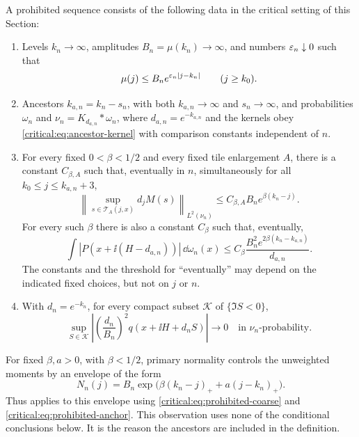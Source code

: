 \begin{definition}\label{def:prohibited-sequence}
A prohibited sequence consists of the following data in the critical
setting of this Section:
\begin{enumerate}[label=\textup{(\roman*)}]
 \item Levels \(k_n\to\infty\), amplitudes
 \(B_n=\mu(k_n)\to\infty\), and numbers \(\varepsilon_n\downarrow0\)
 such that
 \begin{equation}\label{critical:eq:primary-normality}
  \mu(j)\le B_n e^{\varepsilon_n|j-k_n|}
       \qquad(j\ge k_0).
 \end{equation}
 \item Ancestors \(k_{a,n}=k_n-s_n\), with both
 \(k_{a,n}\to\infty\) and \(s_n\to\infty\), and probabilities
 \(\omega_n\) and
 \(\nu_n=K_{d_{a,n}}*\omega_n\), where
 \(d_{a,n}=e^{-k_{a,n}}\) and the kernels obey
 \eqref{critical:eq:ancestor-kernel} with comparison constants
 independent of \(n\).
 \item For every fixed \(0<\beta<1/2\) and every fixed tile
 enlargement \(A\), there is a constant \(C_{\beta,A}\) such that,
 eventually in \(n\), simultaneously for all
 \(k_0\le j\le k_{a,n}+3\),
 \begin{equation}\label{critical:eq:prohibited-coarse}
  \left\|\sup_{s\in\mathcal T_A(j,x)}d_jM(s)\right\|_{L^2(\nu_n)}
   \le C_{\beta,A} B_n e^{\beta(k_n-j)}.
 \end{equation}
 For every such \(\beta\) there is also a constant \(C_\beta\)
 such that, eventually,
 \begin{equation}\label{critical:eq:prohibited-anchor}
  \int |P(x+\ii(H-d_{a,n}))|\,\dd\omega_n(x)
   \le C_\beta
       \frac{B_n^2e^{2\beta(k_n-k_{a,n})}}{d_{a,n}}.
 \end{equation}
 The constants and the threshold for ``eventually'' may depend on
 the indicated fixed choices, but not on \(j\) or \(n\).
 \item With \(d_n=e^{-k_n}\), for every compact subset
 \(\mathcal K\) of \(\{\Im S<0\}\),
 \begin{equation}\label{critical:eq:prohibited-Q}
  \sup_{S\in\mathcal K}
  \left|\left(\frac{d_n}{B_n}\right)^2
          q(x+\ii H+d_nS)\right|
  \longrightarrow0
  \quad\text{in }\nu_n\text{-probability}.
 \end{equation}
\end{enumerate}
\end{definition}

For fixed \(\beta,a>0\), with \(\beta<1/2\), primary normality
controls the unweighted moments by an envelope of the form
\[
 N_n(j)=B_n
   \exp\bigl(\beta(k_n-j)_++a(j-k_n)_+\bigr).
\]
Thus  applies to this envelope using
\eqref{critical:eq:prohibited-coarse} and
\eqref{critical:eq:prohibited-anchor}. This observation uses none of
the conditional conclusions below. It is the reason the ancestors
are included in the definition.

